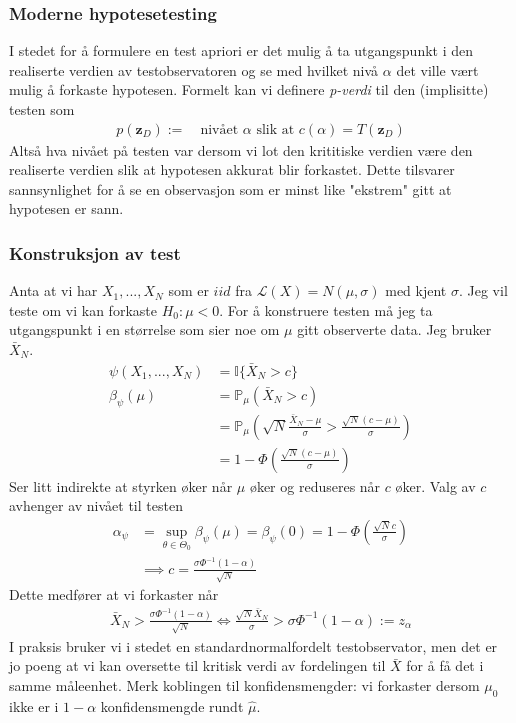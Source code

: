 \subsubsection{Moderne hypotesetesting}
I stedet for å formulere en test apriori er det mulig å ta utgangspunkt i den realiserte verdien av testobservatoren og se med hvilket nivå $\alpha$ det ville vært mulig å forkaste hypotesen. Formelt kan vi definere \textit{p-verdi} til den (implisitte) testen som
\begin{align}
p(\mathbf{z}_D):= \quad \text{nivået $\alpha$ slik at } c(\alpha) = T(\mathbf{z}_D)
\end{align}
Altså hva nivået på testen var dersom vi lot den krititiske verdien være den realiserte verdien slik at hypotesen akkurat blir forkastet. Dette tilsvarer sannsynlighet for å se en observasjon som er minst like "ekstrem" gitt at hypotesen er sann. 
\subsubsection{Konstruksjon av test}
Anta at vi har $X_1,...,X_N$ som er $iid$ fra $\mathcal{L}(X) = N(\mu,\sigma)$ med kjent $\sigma$. Jeg vil teste om vi kan forkaste $H_0: \mu < 0$. For å konstruere testen må jeg ta utgangspunkt i en størrelse som sier noe om $\mu$ gitt observerte data. Jeg bruker $\bar{X}_N$. 
\begin{align}
\psi(X_1,...,X_N) &= \mathbb{I}\{\bar{X}_N > c\} \\
\beta_{\psi}(\mu) &= \mathbb{P}_{\mu}\left(\bar{X}_N > c\right) \\
&= \mathbb{P}_{\mu}\left(\sqrt{N}\frac{\bar{X}_N-\mu}{\sigma} > \frac{\sqrt{N}(c-\mu)}{\sigma}\right) \\
&= 1-\Phi\left(\frac{\sqrt{N}(c-\mu)}{\sigma}\right)
\end{align}
Ser litt indirekte at styrken øker når $\mu$ øker og reduseres når $c$ øker. Valg av $c$ avhenger av nivået til testen
\begin{align}
\alpha_{\psi}&=\sup_{\theta \in \Theta_0} \beta_{\psi}(\mu) = \beta_{\psi}(0) = 1-\Phi\left(\frac{\sqrt{N}c}{\sigma}\right)  \\
& \implies c = \frac{\sigma \Phi^{-1}(1-\alpha)}{\sqrt{N}}
\end{align}
Dette medfører at vi forkaster når
\begin{align}
\bar{X}_N > \frac{\sigma \Phi^{-1}(1-\alpha)}{\sqrt{N}} \iff \frac{\sqrt{N}\bar{X}_N}{\sigma} > \sigma \Phi^{-1}(1-\alpha):=z_{\alpha}
\end{align}
I praksis bruker vi i stedet en standardnormalfordelt testobservator, men det er jo poeng at vi kan oversette til kritisk verdi av fordelingen til $\bar{X}$ for å få det i samme måleenhet. Merk koblingen til konfidensmengder: vi forkaster dersom $\mu_0$ ikke er i $1-\alpha$ konfidensmengde rundt $\hat{\mu}$.
